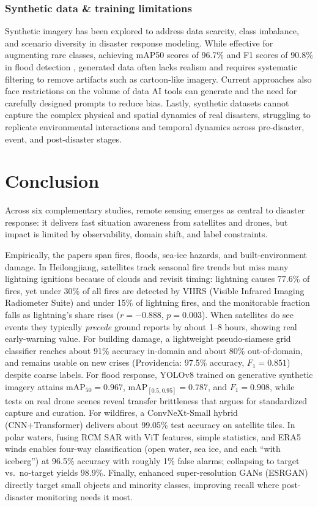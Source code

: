 \documentclass[conference,a4paper]{IEEEtran}
\begin{document}
\subsubsection{\textbf{Synthetic data \& training limitations}}
Synthetic imagery has been explored to address data scarcity, class imbalance, and scenario diversity in disaster response modeling. While effective for augmenting rare classes, achieving mAP50 scores of 96.7\% and F1 scores of 90.8\% in flood detection \cite{teohExploringGenerativeAI2024}, generated data often lacks realism and requires systematic filtering to remove artifacts such as cartoon-like imagery. Current approaches also face restrictions on the volume of data AI tools can generate and the need for carefully designed prompts to reduce bias. Lastly, synthetic datasets cannot capture the complex physical and spatial dynamics of real disasters, struggling to replicate environmental interactions and temporal dynamics across pre-disaster, event, and post-disaster stages.


\section{Conclusion}
Across six complementary studies, remote sensing emerges as central to disaster response: it delivers fast situation awareness from satellites and drones, but impact is limited by observability, domain shift, and label constraints.

Empirically, the papers span fires, floods, sea-ice hazards, and built-environment damage. In Heilongjiang, satellites track seasonal fire trends but miss many lightning ignitions because of clouds and revisit timing: lightning causes 77.6\% of fires, yet under 30\% of all fires are detected by VIIRS (Visible Infrared Imaging Radiometer Suite) and under 15\% of lightning fires, and the monitorable fraction falls as lightning’s share rises ($r=-0.888$, $p=0.003$). When satellites do see events they typically \emph{precede} ground reports by about 1--8 hours, showing real early-warning value. For building damage, a lightweight pseudo-siamese grid classifier reaches about 91\% accuracy in-domain and about 80\% out-of-domain, and remains usable on new crises (Providencia: 97.5\% accuracy, $F_1=0.851$) despite coarse labels. For flood response, YOLOv8 trained on generative synthetic imagery attains $\text{mAP}_{50}=0.967$, $\text{mAP}_{[0.5,0.95]}=0.787$, and $F_1=0.908$, while tests on real drone scenes reveal transfer brittleness that argues for standardized capture and curation. For wildfires, a ConvNeXt-Small hybrid (CNN+Transformer) delivers about 99.05\% test accuracy on satellite tiles. In polar waters, fusing RCM SAR with ViT features, simple statistics, and ERA5 winds enables four-way classification (open water, sea ice, and each “with iceberg”) at 96.5\% accuracy with roughly 1\% false alarms; collapsing to target vs.\ no-target yields 98.9\%. Finally, enhanced super-resolution GANs (ESRGAN) directly target small objects and minority classes, improving recall where post-disaster monitoring needs it most.
\end{document}
